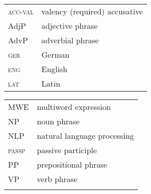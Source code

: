 \documentclass[output=paper,colorlinks,citecolor=brown]{langscibook}
\begin{document}
\begin{tabularx}{.5\textwidth}{@{}lQ@{}}
\textsc{acc-val} & valency (required) accusative\\
AdjP & adjective phrase\\
AdvP & adverbial phrase\\
\textsc{ger} & German\\
\textsc{eng} & English\\
\textsc{lat} & Latin
\end{tabularx}%
\begin{tabularx}{.5\textwidth}{@{}lQ@{}}
\textsc{MWE} & multiword expression\\
\textsc{NP} & noun phrase\\
\textsc{NLP} & natural language processing\\
\textsc{passp} & passive participle\\
\textsc{PP} & prepositional phrase\\
\textsc{VP} & verb phrase \\
&
\end{tabularx}
\end{document}

